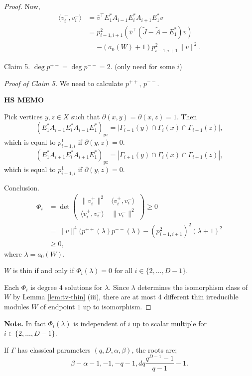 \documentclass[
]{book}
\theoremstyle{definition}
\theoremstyle{definition}
\theoremstyle{definition}
\theoremstyle{definition}
\theoremstyle{remark}
\begin{document}
\begin{proof}
Now,
\begin{align}
\langle v^+_i, v^-_i\rangle & = \bar{v}^\top E^*_1A_{i-1}E^*_iA_{i+1}E^*_1v\\
& = p^2_{i-1,i+1}(\bar{v}^\top (\tilde{J}-\tilde{A}-E^*_1)v)\\
& = -(a_0(W)+1)p^2_{i-1,i+1}\|v\|^2.
\end{align}

Claim 5. \(\deg p^{++} = \deg p^{--} = 2\). (only need for some \(i\))

\emph{Proof of Claim 5.}
We need to calculate \(p^{++}\), \(p^{--}\).

\textbf{HS MEMO}

Pick vertices \(y,z\in X\) such that \(\partial(x,y) = \partial(x,z) =1\). Then
\[(E^*_1A_{i-1}E^*_iA_{i-1}E^*_1)_{yz} = |\Gamma_{i-1}(y)\cap \Gamma_i(x)\cap \Gamma_{i-1}(z)|,\]
which is equal to \(p^{1}_{i-1,i}\) if \(\partial(y,z)=0\).
\[(E^*_1A_{i+1}E^*_iA_{i+1}E^*_1)_{yz} = |\Gamma_{i+1}(y)\cap \Gamma_i(x)\cap \Gamma_{i+1}(z)|,\]
which is equal to \(p^{1}_{i+1,i}\) if \(\partial(y,z)=0\).

Conclusion.
\begin{align}
\Phi_i & = \det \begin{pmatrix}\|v^+_i\|^2 & \langle v^+_i, v^-_i\rangle\\
\langle v^+_i,v^-_i\rangle & \|v^-_i\|^2 \end{pmatrix} \geq 0\\
& = \|v\|^4(p^{++}(\lambda)p^{--}(\lambda) - (p^2_{i-1,i+1})^2(\lambda+1)^2\\
& \geq 0,
\end{align}
where \(\lambda = a_0(W)\).

\(W\) is thin if and only if \(\Phi_i(\lambda) = 0\) for all \(i\in \{2, \ldots, D-1\}\).

Each \(\Phi_i\) is degree \(4\) solutions for \(\lambda\). Since \(\lambda\) determines the isomorphism class of \(W\) by Lemma \ref{lem:tv-thin} (iii), there are at most \(4\) different thin irreducible modules \(W\) of endpoint \(1\) up to isomorphism.

\end{proof}

\textbf{Note.}
In fact \(\Phi_i(\lambda)\) is independent of \(i\) up to scalar multiple for \(i\in \{2,\ldots, D-1\}\).

If \(\Gamma\) has classical parameters \((q,D, \alpha, \beta)\), the roots are;
\[\beta-\alpha-1, -1, -q-1, dq\frac{q^{D-1}-1}{q-1}-1.\]
\end{document}
